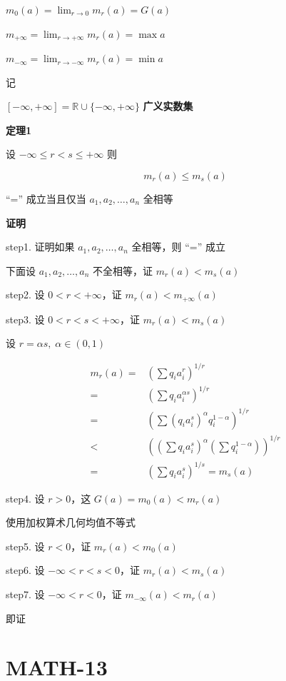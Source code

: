 \(m_{0}(a)=\lim_{ r \to 0 } m_{r}(a)=G(a)\)

\(m_{+\infty}=\lim_{ r \to +\infty }m_{r}(a)= \max a\)

\(m_{-\infty}=\lim_{ r \to -\infty }m_{r}(a)=\min a\)

记

\([-\infty, +\infty]=\mathbb{R} \cup\{-\infty, +\infty  \}\)
\textbf{广义实数集}

\textbf{定理1}

设 \(-\infty\leq r<s\leq +\infty\) 则

\[
m_{r}(a)\leq m_{s}(a)
\]

``='' 成立当且仅当 \(a_{1},a_{2},\dots,a_{n}\) 全相等

\textbf{证明}

step1. 证明如果 \(a_{1},a_{2},\dots,a_{n}\) 全相等，则 ``='' 成立

下面设 \(a_{1},a_{2}, \dots,a_{n}\) 不全相等，证 \(m_r(a)<m_s(a)\)

step2. 设 \(0<r<+\infty\)，证 \(m_{r}(a)<m_{+\infty}(a)\)

step3. 设 \(0<r<s<+\infty\)，证 \(m_{r}(a)<m_{s}(a)\)

设 \(r=\alpha s, \; \alpha \in (0, 1)\)

\[
\begin{aligned}
m_{r}(a)=&\left( \sum q_{i} a_{i}^{r} \right)^{1/r} \\
=& \left( \sum q_{i}a_{i}^{\alpha s} \right)^{1/r}\\
=& \left( \sum (q_{i}a_{i}^{s})^{\alpha} q_{i}^{1-\alpha}\right)^{1/r}\\
<&\left( \left( \sum q_{i}a_{i}^{s} \right)^{\alpha} \left( \sum q_{i}^{1-\alpha} \right)\right)^{1/r}\\
=& \left( \sum q_{i}a_{i}^{s} \right)^{1/s}=m_{s}(a)
\end{aligned}
\]

step4. 设 \(r>0\)，这 \(G(a)=m_{0}(a)<m_{r}(a)\)

使用加权算术几何均值不等式

step5. 设 \(r<0\)，证 \(m_{r}(a)<m_{0}(a)\)

step6. 设 \(-\infty<r<s<0\)，证 \(m_{r}(a)<m_{s}(a)\)

step7. 设 \(-\infty<r<0\)，证 \(m_{-\infty}(a)<m_{r}(a)\)

即证

\section{MATH-13}\label{math-13}

